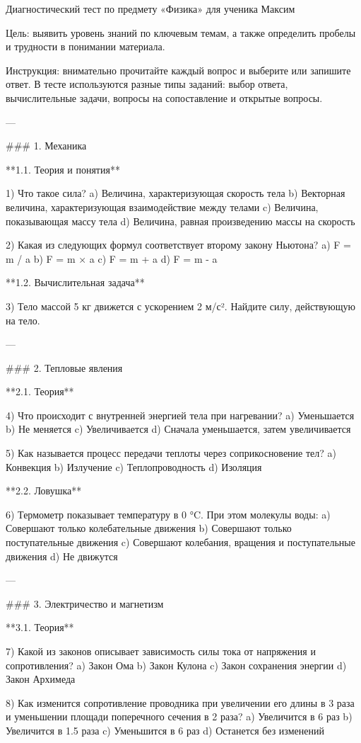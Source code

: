 \documentclass{article}
\begin{document}
Диагностический тест по предмету «Физика» для ученика Максим

Цель: выявить уровень знаний по ключевым темам, а также определить пробелы и трудности в понимании материала.

Инструкция: внимательно прочитайте каждый вопрос и выберите или запишите ответ. В тесте используются разные типы заданий: выбор ответа, вычислительные задачи, вопросы на сопоставление и открытые вопросы.

---

### 1. Механика

**1.1. Теория и понятия**

1) Что такое сила?  
a) Величина, характеризующая скорость тела  
b) Векторная величина, характеризующая взаимодействие между телами  
c) Величина, показывающая массу тела  
d) Величина, равная произведению массы на скорость

2) Какая из следующих формул соответствует второму закону Ньютона?  
a) F = m / a  
b) F = m × a  
c) F = m + a  
d) F = m - a

**1.2. Вычислительная задача**

3) Тело массой 5 кг движется с ускорением 2 м/с². Найдите силу, действующую на тело.

---

### 2. Тепловые явления

**2.1. Теория**

4) Что происходит с внутренней энергией тела при нагревании?  
a) Уменьшается  
b) Не меняется  
c) Увеличивается  
d) Сначала уменьшается, затем увеличивается

5) Как называется процесс передачи теплоты через соприкосновение тел?  
a) Конвекция  
b) Излучение  
c) Теплопроводность  
d) Изоляция

**2.2. Ловушка**

6) Термометр показывает температуру в 0 °C. При этом молекулы воды:  
a) Совершают только колебательные движения  
b) Совершают только поступательные движения  
c) Совершают колебания, вращения и поступательные движения  
d) Не движутся

---

### 3. Электричество и магнетизм

**3.1. Теория**

7) Какой из законов описывает зависимость силы тока от напряжения и сопротивления?  
a) Закон Ома  
b) Закон Кулона  
c) Закон сохранения энергии  
d) Закон Архимеда

8) Как изменится сопротивление проводника при увеличении его длины в 3 раза и уменьшении площади поперечного сечения в 2 раза?  
a) Увеличится в 6 раз  
b) Увеличится в 1.5 раза  
c) Уменьшится в 6 раз  
d) Останется без изменений
\end{document}
